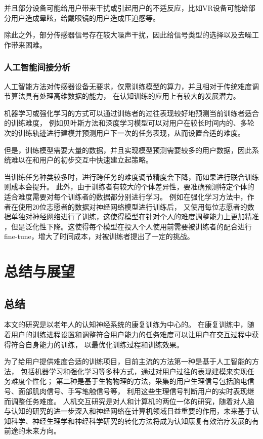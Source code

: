 \documentclass{article}
\begin{document}
            并且部分设备可能给用户带来干扰或引起用户的不适反应，比如VR设备可能给部分用户造成晕眩，给戴眼镜的用户造成压迫感等。

            除此之外，部分传感器信号存在较大噪声干扰，因此给信号类型的选择以及去噪工作带来困难。
            
            \subsubsection{人工智能间接分析}
            人工智能方法对传感器设备无要求，仅需训练模型的算力，并且相对于传统难度调节算法具有处理高维数据的能力，
            在认知训练的应用上有较大的发展潜力。

            机器学习或强化学习的方式可以通过训练者的过往表现较好地预测当前训练者适合的训练难度，
            例如贝叶斯方法和深度学习模型可以对用户在较长时间内的、多轮次的训练轨迹进行建模并预测用户下一次的任务表现，从而设置合适的难度。

            但是，训练模型需要大量的数据，并且实现模型预测需要较多的用户数据，因此系统难以在和用户的初步交互中快速建立起策略。
            
            当训练任务种类较多时，进行跨任务的难度调节精度会下降，而如果进行联合训练则成本会提升。
            此外，由于训练者有较大的个体差异性，要准确预测特定个体的适合难度需要对每个训练者的数据都分别进行学习。
            例如在强化学习方法中，作者在使用20位志愿者的数据对神经网络模型进行训练后，
            又使用每位志愿者的数据单独对神经网络进行了训练，这使得模型在针对个人的难度调整能力上更加精准
            ，但是泛化性下降。这使得每个模型在投入个人使用前需要被训练者的配合进行fine-tune，增大了时间成本，对被训练者提出了一定的挑战。
            






    \section{总结与展望}
    \subsection{总结}
    本文的研究是以老年人的认知神经系统的康复训练为中心的。
    在康复训练中，随着用户的训练进程设置和调整符合用户能力的任务难度可以让用户在交互过程中获得符合自身能力的训练，
    以最优化训练过程和训练效果。
    
    为了给用户提供难度合适的训练项目，目前主流的方法第一种是基于人工智能的方法，
    包括机器学习和强化学习等多种方式，通过对用户过往的表现建模来实现任务难度个性化；
    第二种是基于生物物理的方法，采集的用户生理信号包括脑电信号、面部肌肉信号、手写笔触信号等，
    利用这些生理信号判断用户的实时表现继而调整任务难度。
    人机交互研究是对人和计算机的两位一体的研究，随着对人脑与认知的研究的进一步深入和神经网络在计算机领域日益重要的作用，未来基于认知科学、神经生理学和神经科学研究的转化方法将成为认知康复有效治疗发展的有前途的未来方向。
\end{document}
